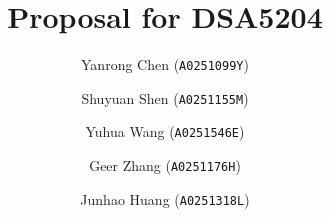 \author{
  Yanrong Chen (\texttt{A0251099Y})
  \and
 Shuyuan Shen (\texttt{A0251155M})
  \and
  Yuhua Wang (\texttt{A0251546E})
  \and
  Geer Zhang (\texttt{A0251176H})
  \and
  Junhao Huang (\texttt{A0251318L})
}

\title{Proposal for DSA5204}  %
\date{}
